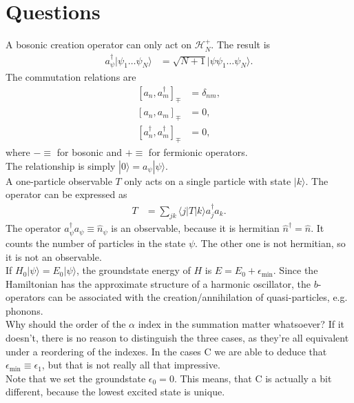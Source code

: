 \documentclass[english, parskip=full]{scrartcl}
\title{\titel}
\author{\autor}
\date{\today}
\newcommand{\braket}{}
\newcommand{\klam}{}
\newcommand{\tecxt}{}
\newcommand{\Ket}{}
\begin{document}
\maketitle  %

\section{Questions}
A bosonic creation operator can only act on $\mathcal{H}_N^+$. 
The result is
\begin{align}
a_\psi^\dagger\Ket | {\psi_1\dots\psi_N} \rangle&=\sqrt{N+1}\Ket | {\psi \psi_1\dots\psi_N} \rangle.
\end{align}
The commutation relations are
\begin{align}
\klam\left[ {a_n,a_m^\dagger} \right]_\mp &=\delta_{nm},\\
\klam\left[ {a_n,a_m} \right]_\mp&=0,\\
\klam\left[ {a_n^\dagger,a_m^\dagger} \right]_\mp&=0,
\end{align}
where $-\equiv$ for bosonic and $+\equiv$ for fermionic operators.
\\
The relationship is simply $\Ket | {0} \rangle=a_\psi\Ket | {\psi} \rangle$.
\\
A one-particle observable $T$ only acts on a single particle with state $\Ket | {k} \rangle$. 
The operator can be expressed as
\begin{align}
T&=\sum_{jk}\braket\langle {j} | {T} | {k}\rangle a_j^\dagger a_k.
\end{align}
The operator $a_\psi^\dagger a_\psi\equiv \hat{n}_\psi$ is an observable, because it is hermitian $\hat{n}^\dagger = \hat{n}$.
It counts the number of particles in the state $\psi$.
The other one is not hermitian, so it is not an observable.
\\
If $H_0\Ket | {\psi} \rangle=E_0\Ket | {\psi} \rangle$, the groundstate energy of $H$ is $E=E_0+\epsilon_\tecxt\text{min}$. 
Since the Hamiltonian has the approximate structure of a harmonic oscillator, the $b$-operators can be associated with the creation/annihilation of quasi-particles, e.g. phonons. 
\\
Why should the order of the $\alpha$ index in the summation matter whatsoever? 
If it doesn't, there is no reason to distinguish the three cases, as they're all equivalent under a reordering of the indexes. 
In the cases C we are able to deduce that $\epsilon_\tecxt\text{min}\equiv\epsilon_1$, but that is not really all that impressive.
\\
Note that we set the groundstate $\epsilon_0=0$. 
This means, that C is actually a bit different, because the lowest excited state is unique.
\end{document}

